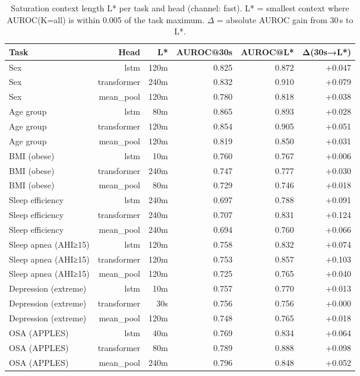 \begin{table}[ht]
\centering
\caption{Saturation context length L* per task and head (channel: fast). L* = smallest context where AUROC(K=all) is within 0.005 of the task maximum. $\Delta$ = absolute AUROC gain from 30\,s to L*.}
\label{tab:lstar_fast}
\begin{tabular}{lrrrrr}
\toprule
Task & Head & L* & AUROC@30s & AUROC@L* & Δ(30s→L*) \\
\midrule
Sex & lstm & 120m & 0.825 & 0.872 & +0.047 \\
Sex & transformer & 240m & 0.832 & 0.910 & +0.079 \\
Sex & mean_pool & 120m & 0.780 & 0.818 & +0.038 \\
Age group & lstm & 80m & 0.865 & 0.893 & +0.028 \\
Age group & transformer & 120m & 0.854 & 0.905 & +0.051 \\
Age group & mean_pool & 120m & 0.819 & 0.850 & +0.031 \\
BMI (obese) & lstm & 10m & 0.760 & 0.767 & +0.006 \\
BMI (obese) & transformer & 240m & 0.747 & 0.777 & +0.030 \\
BMI (obese) & mean_pool & 80m & 0.729 & 0.746 & +0.018 \\
Sleep efficiency & lstm & 240m & 0.697 & 0.788 & +0.091 \\
Sleep efficiency & transformer & 240m & 0.707 & 0.831 & +0.124 \\
Sleep efficiency & mean_pool & 240m & 0.694 & 0.760 & +0.066 \\
Sleep apnea (AHI≥15) & lstm & 120m & 0.758 & 0.832 & +0.074 \\
Sleep apnea (AHI≥15) & transformer & 120m & 0.753 & 0.857 & +0.103 \\
Sleep apnea (AHI≥15) & mean_pool & 120m & 0.725 & 0.765 & +0.040 \\
Depression (extreme) & lstm & 10m & 0.757 & 0.770 & +0.013 \\
Depression (extreme) & transformer & 30s & 0.756 & 0.756 & +0.000 \\
Depression (extreme) & mean_pool & 120m & 0.748 & 0.765 & +0.018 \\
OSA (APPLES) & lstm & 40m & 0.769 & 0.834 & +0.064 \\
OSA (APPLES) & transformer & 80m & 0.789 & 0.888 & +0.098 \\
OSA (APPLES) & mean_pool & 240m & 0.796 & 0.848 & +0.052 \\
\bottomrule
\end{tabular}
\end{table}